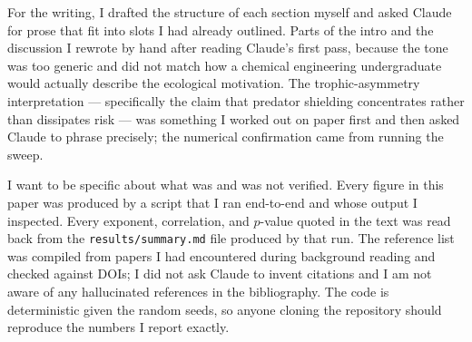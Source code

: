 \documentclass[11pt,a4paper]{article}
\begin{document}
For the writing, I drafted the structure of each section myself and asked Claude for prose that fit into slots I had already outlined. Parts of the intro and the discussion I rewrote by hand after reading Claude's first pass, because the tone was too generic and did not match how a chemical engineering undergraduate would actually describe the ecological motivation. The trophic-asymmetry interpretation --- specifically the claim that predator shielding concentrates rather than dissipates risk --- was something I worked out on paper first and then asked Claude to phrase precisely; the numerical confirmation came from running the sweep.

I want to be specific about what was and was not verified. Every figure in this paper was produced by a script that I ran end-to-end and whose output I inspected. Every exponent, correlation, and $p$-value quoted in the text was read back from the \texttt{results/summary.md} file produced by that run. The reference list was compiled from papers I had encountered during background reading and checked against DOIs; I did not ask Claude to invent citations and I am not aware of any hallucinated references in the bibliography. The code is deterministic given the random seeds, so anyone cloning the repository should reproduce the numbers I report exactly.
\end{document}
